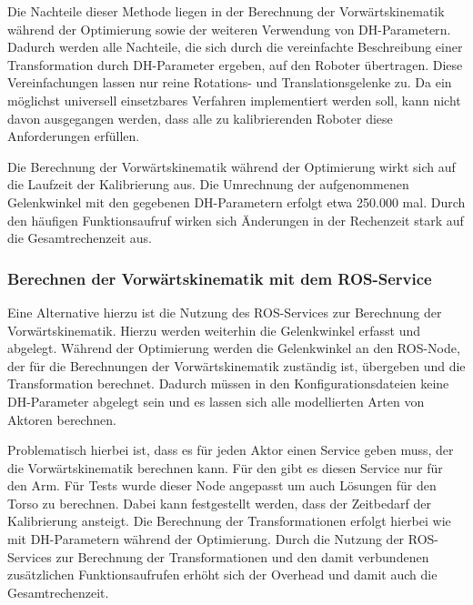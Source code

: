 Die Nachteile dieser Methode liegen in der Berechnung der Vorwärtskinematik während der
Optimierung sowie der weiteren Verwendung von \ac{DH-Parameter}n. Dadurch 
werden alle Nachteile, die sich durch die vereinfachte Beschreibung einer 
Transformation durch \ac{DH-Parameter} ergeben, auf den Roboter übertragen.
Diese Vereinfachungen lassen nur reine Rotations- und Translationsgelenke zu.
Da ein möglichst universell einsetzbares Verfahren implementiert werden soll, 
kann nicht davon ausgegangen werden, dass alle zu kalibrierenden Roboter diese 
Anforderungen erfüllen. 

Die Berechnung der Vorwärtskinematik während der Optimierung wirkt sich auf die 
Laufzeit der Kalibrierung aus. Die Umrechnung der aufgenommenen Gelenkwinkel mit 
den gegebenen \ac{DH-Parameter}n erfolgt etwa 250.000 mal. Durch den häufigen 
Funktionsaufruf wirken sich Änderungen in der Rechenzeit stark auf die 
Gesamtrechenzeit aus.

\subsubsection{Berechnen der Vorwärtskinematik mit dem ROS-Service} %

\label{ssub:Berechnen der Vorwärtskinematik mit dem ROS-Service}

Eine Alternative hierzu ist die Nutzung des ROS-Services zur Berechnung der Vorwärtskinematik.
Hierzu werden weiterhin die Gelenkwinkel erfasst und abgelegt. Während der Optimierung werden
die Gelenkwinkel an den ROS-Node, der für die Berechnungen der Vorwärtskinematik zuständig ist, 
übergeben und die Transformation berechnet. Dadurch müssen in den Konfigurationsdateien keine
\ac{DH-Parameter} abgelegt sein und es lassen sich alle modellierten Arten von Aktoren berechnen.

Problematisch hierbei ist, dass es für jeden Aktor einen Service geben muss, der die 
Vorwärtskinematik berechnen kann. Für den \cob gibt es diesen Service nur für den Arm.
Für Tests wurde dieser Node angepasst um auch Lösungen für den Torso zu berechnen.
Dabei kann festgestellt werden, dass der Zeitbedarf der Kalibrierung ansteigt.
Die Berechnung der Transformationen erfolgt hierbei wie mit \ac{DH-Parameter}n
während der Optimierung. Durch die Nutzung der \ac{ROS}-Services zur Berechnung 
der Transformationen und den damit verbundenen zusätzlichen Funktionsaufrufen 
erhöht sich der Overhead und damit auch die Gesamtrechenzeit. 


